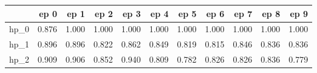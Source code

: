 \begin{tabular}{lrrrrrrrrrr}
\toprule
{} &   ep 0 &   ep 1 &   ep 2 &   ep 3 &   ep 4 &   ep 5 &   ep 6 &   ep 7 &   ep 8 &   ep 9 \\
\midrule
hp\_0 &  0.876 &  1.000 &  1.000 &  1.000 &  1.000 &  1.000 &  1.000 &  1.000 &  1.000 &  1.000 \\
hp\_1 &  0.896 &  0.896 &  0.822 &  0.862 &  0.849 &  0.819 &  0.815 &  0.846 &  0.836 &  0.836 \\
hp\_2 &  0.909 &  0.906 &  0.852 &  0.940 &  0.809 &  0.782 &  0.826 &  0.826 &  0.836 &  0.779 \\
\bottomrule
\end{tabular}
